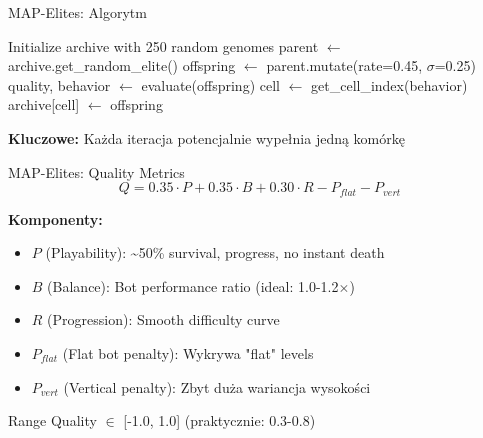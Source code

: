 \documentclass{beamer}
\begin{document}
\begin{frame}{MAP-Elites: Algorytm}
\begin{algorithmic}[1]
\STATE Initialize archive with 250 random genomes
    \STATE parent $\leftarrow$ archive.get\_random\_elite()
    \STATE offspring $\leftarrow$ parent.mutate(rate=0.45, $\sigma$=0.25)
    \STATE quality, behavior $\leftarrow$ evaluate(offspring)
    \STATE cell $\leftarrow$ get\_cell\_index(behavior)
        \STATE archive[cell] $\leftarrow$ offspring
    \ENDIF
\ENDFOR
\end{algorithmic}

\vspace{0.3cm}
\textbf{Kluczowe:} Każda iteracja potencjalnie wypełnia jedną komórkę
\end{frame}

\begin{frame}{MAP-Elites: Quality Metrics}
\begin{equation}
Q = 0.35 \cdot P + 0.35 \cdot B + 0.30 \cdot R - P_{flat} - P_{vert}
\end{equation}

\textbf{Komponenty:}
\begin{itemize}
\item $P$ (Playability): \textasciitilde50\% survival, progress, no instant death
\item $B$ (Balance): Bot performance ratio (ideal: 1.0-1.2$\times$)
\item $R$ (Progression): Smooth difficulty curve
\item $P_{flat}$ (Flat bot penalty): Wykrywa "flat" levels
\item $P_{vert}$ (Vertical penalty): Zbyt duża wariancja wysokości
\end{itemize}

\vspace{0.3cm}
\begin{block}{Range}
Quality $\in$ [-1.0, 1.0] (praktycznie: 0.3-0.8)
\end{block}
\end{frame}
\end{document}
